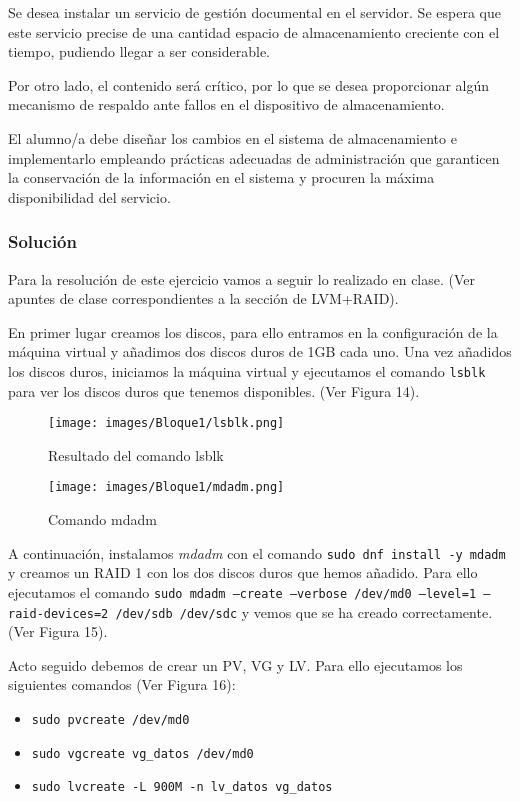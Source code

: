 Se desea instalar un servicio de gestión documental en el servidor. Se espera que este servicio
precise de una cantidad espacio de almacenamiento creciente con el tiempo, pudiendo llegar a
ser considerable.

Por otro lado, el contenido será crítico, por lo que se desea proporcionar
algún mecanismo de respaldo ante fallos en el dispositivo de almacenamiento.

El alumno/a debe diseñar los cambios en el sistema de almacenamiento e implementarlo
empleando prácticas adecuadas de administración que garanticen la conservación de la
información en el sistema y procuren la máxima disponibilidad del servicio.

\subsubsection{Solución}

Para la resolución de este ejercicio vamos a seguir lo realizado en clase. (Ver apuntes de clase correspondientes a la sección de LVM+RAID).

En primer lugar creamos los discos, para ello entramos en la configuración de la máquina virtual y añadimos dos discos duros de 1GB cada uno. Una vez añadidos los discos duros, iniciamos la máquina virtual y ejecutamos el comando \texttt{lsblk} para ver los discos duros que tenemos disponibles. (Ver Figura 14).

\begin{figure}[htbp]
  \centering
  \begin{minipage}[b]{0.45\textwidth}
      \centering
      \texttt{[image: images/Bloque1/lsblk.png]}
      \caption{Resultado del comando lsblk}
  \end{minipage}
  \hfill
  \begin{minipage}[b]{0.45\textwidth}
      \centering
      \texttt{[image: images/Bloque1/mdadm.png]}
      \caption{Comando mdadm}
  \end{minipage}
\end{figure}

A continuación, instalamos \textit{mdadm} con el comando \texttt{sudo dnf install -y mdadm} y creamos un RAID 1 con los dos discos duros que hemos añadido. Para ello ejecutamos el comando \texttt{sudo mdadm --create --verbose /dev/md0 --level=1 --raid-devices=2 /dev/sdb /dev/sdc} y vemos que se ha creado correctamente. (Ver Figura 15).

Acto seguido debemos de crear un PV, VG y LV. Para ello ejecutamos los siguientes comandos (Ver Figura 16):
\begin{itemize}
  \item \texttt{sudo pvcreate /dev/md0}
  \item \texttt{sudo vgcreate vg\_datos /dev/md0}
  \item \texttt{sudo lvcreate -L 900M -n lv\_datos vg\_datos}
\end{itemize}


